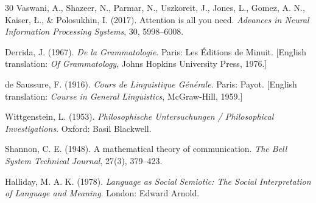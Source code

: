 \documentclass[12pt,a4paper]{article}
\begin{document}
\begin{thebibliography}{30}
Vaswani, A., Shazeer, N., Parmar, N., Uszkoreit, J., Jones, L., Gomez, A. N., Kaiser, {\L}., \& Polosukhin, I. (2017).
Attention is all you need.
\textit{Advances in Neural Information Processing Systems}, 30, 5998--6008.

Derrida, J. (1967).
\textit{De la Grammatologie}.
Paris: Les \'Editions de Minuit.
[English translation: \textit{Of Grammatology}, Johns Hopkins University Press, 1976.]

de Saussure, F. (1916).
\textit{Cours de Linguistique G\'en\'erale}.
Paris: Payot.
[English translation: \textit{Course in General Linguistics}, McGraw-Hill, 1959.]

Wittgenstein, L. (1953).
\textit{Philosophische Untersuchungen / Philosophical Investigations}.
Oxford: Basil Blackwell.

Shannon, C. E. (1948).
A mathematical theory of communication.
\textit{The Bell System Technical Journal}, 27(3), 379--423.

Halliday, M. A. K. (1978).
\textit{Language as Social Semiotic: The Social Interpretation of Language and Meaning}.
London: Edward Arnold.

\end{thebibliography}
\end{document}
